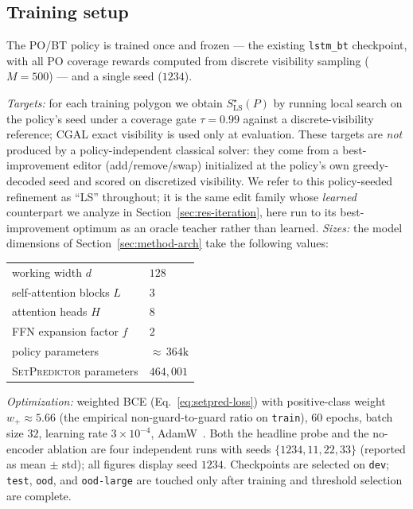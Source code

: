 \documentclass[preprint,10pt]{elsarticle}
\newcommand{\SetPredictor}{\textup{\textsc{SetPredictor}}}
\begin{document}
\subsection{Training setup}
\label{sec:exp-training}

The PO/BT policy is trained once and frozen --- the existing \texttt{lstm\_bt} checkpoint, with all PO coverage rewards computed from discrete visibility sampling ($M = 500$) --- and a single seed ($1234$). 

\medskip 

\emph{Targets:} for each training polygon we obtain $S^\star_{\mathrm{LS}}(P)$ by running local search on the policy's seed under a coverage gate $\tau = 0.99$ against a discrete-visibility reference; CGAL exact visibility is used only at evaluation. These targets are \emph{not} produced by a policy-independent classical solver: they come from a best-improvement editor (add/remove/swap) initialized at the policy's own greedy-decoded seed and scored on discretized visibility. We refer to this policy-seeded refinement as ``LS'' throughout; it is the same edit family whose \emph{learned} counterpart we analyze in Section~\ref{sec:res-iteration}, here run to its best-improvement optimum as an oracle teacher rather than learned. \emph{Sizes:} the model dimensions of Section~\ref{sec:method-arch} take the following values:
\begin{center}\small
\begin{tabular}{ll}
  \toprule
  working width $d$                & $128$ \\
  self-attention blocks $L$        & $3$ \\
  attention heads $H$              & $8$ \\
  FFN expansion factor $f$         & $2$ \\
  \midrule
  policy parameters                & ${\approx}\,364\text{k}$ \\
  \SetPredictor{} parameters & $464{,}001$ \\
  \bottomrule
\end{tabular}
\end{center}

\medskip

\emph{Optimization:} weighted BCE (Eq.~\eqref{eq:setpred-loss}) with positive-class weight $w_{+} \approx 5.66$ (the empirical non-guard-to-guard ratio on \texttt{train}), $60$ epochs, batch size $32$, learning rate $3 \times 10^{-4}$, AdamW~\cite{Loshchilov2019AdamW}. Both the headline probe and the no-encoder ablation are four independent runs with seeds $\{1234, 11, 22, 33\}$ (reported as mean $\pm$ std); all figures display seed $1234$. Checkpoints are selected on \texttt{dev}; \texttt{test}, \texttt{ood}, and \texttt{ood-large} are touched only after training and threshold selection are complete.
\end{document}
